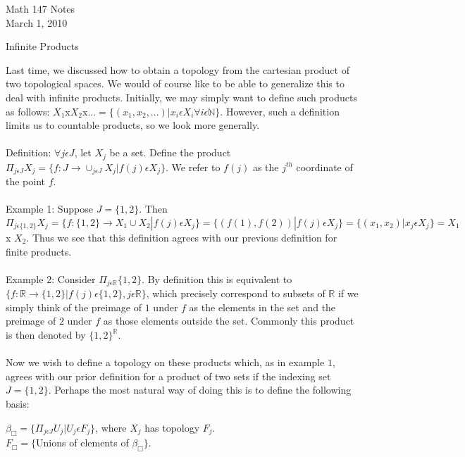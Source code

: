 \documentclass{article}
\begin{document}
\begin{center}
Math 147 Notes\\
March 1, 2010
\end{center}
\vspace{10 mm}
\begin{center}
Infinite Products
\end{center}
Last time, we discussed how to obtain a topology from the cartesian product of two topological spaces.  We would of course like to be able to generalize this to deal with infinite products.  Initially, we may simply want to define such products as follows: $X_1$x$X_2$x...$=\{(x_1,x_2,...)|x_i \epsilon X_i \forall i \epsilon \mathbb{N} \}$.  However, such a definition limits us to countable products, so we look more generally.
\\
\\
Definition: $\forall j \epsilon J$, let $X_j$ be a set.  Define the product $\Pi_{j \epsilon J} X_j = \{f:J \rightarrow \cup_{j \epsilon J}X_j|f(j) \epsilon X_j\}.$  We refer to $f(j)$ as the $j^{th}$ coordinate of the point $f$.
\\
\\
Example 1: Suppose $J = \{1,2\}$.  Then $\Pi_{j\epsilon \{1,2\}}X_j = \{f: \{1,2\} \rightarrow X_1\cup X_2|f(j) \epsilon X_j\} = \{(f(1),f(2))|f(j) \epsilon X_j\}=\{(x_1,x_2)|x_j \epsilon X_j\} = X_1$ x $X_2.$  Thus we see that this definition agrees with our previous definition for finite products.
\\
\\
Example 2: Consider $\Pi_{j \epsilon \mathbb{R}}\{1,2\}$.  By definition this is equivalent to $\{f: \mathbb{R} \rightarrow \{1,2\}| f(j) \epsilon \{1,2\}, j \epsilon \mathbb{R}\}$, which precisely correspond to subsets of $\mathbb{R}$ if we simply think of the preimage of $1$ under $f$ as the elements in the set and the preimage of $2$ under $f$ as those elements outside the set.  Commonly this product is then denoted by $\{1,2\}^{\mathbb{R}}$.
\\
\\
Now we wish to define a topology on these products which, as in example $1$, agrees with our prior definition for a product of two sets if the indexing set $J = \{1,2\}$.  Perhaps the most natural way of doing this is to define the following basis:
\begin{center}
$\beta_{\Box} = \{\Pi_{j \epsilon J} U_j|U_j \epsilon F_j\}$, where $X_j$ has topology $F_j$.
\\
$F_{\Box} = \{$Unions of elements of $\beta_{\Box}\}.$
\end{center}
\end{document}
